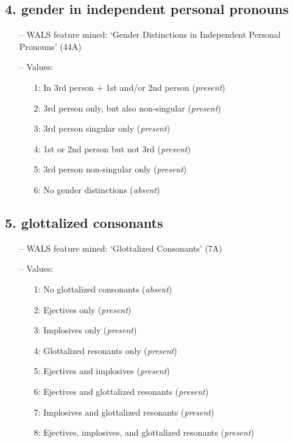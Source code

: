 \subsection*{4. gender in independent personal pronouns}

\begin{itemize}
\item[--] WALS feature mined: `Gender Distinctions in Independent Personal Pronouns' (44A)
\item[--] Values:

\begin{enumerate}
\item[1:] In 3rd person + 1st and/or 2nd person (\emph{present})
\item[2:] 3rd person only, but also non-singular (\emph{present})
\item[3:] 3rd person singular only (\emph{present})
\item[4:] 1st or 2nd person but not 3rd (\emph{present})
\item[5:] 3rd person non-singular only (\emph{present})
\item[6:] No gender distinctions (\emph{absent})
\end{enumerate}
\end{itemize}

\subsection*{5. glottalized consonants}

\begin{itemize}
\item[--] WALS feature mined: `Glottalized Consonants' (7A)
\item[--] Values:

\begin{enumerate}
\item[1:] No glottalized consonants (\emph{absent})
\item[2:] Ejectives only (\emph{present})
\item[3:] Implosives only (\emph{present})
\item[4:] Glottalized resonants only (\emph{present})
\item[5:] Ejectives and implosives (\emph{present})
\item[6:] Ejectives and glottalized resonants (\emph{present})
\item[7:] Implosives and glottalized resonants (\emph{present})
\item[8:] Ejectives, implosives, and glottalized resonants (\emph{present})
\end{enumerate}
\end{itemize}


